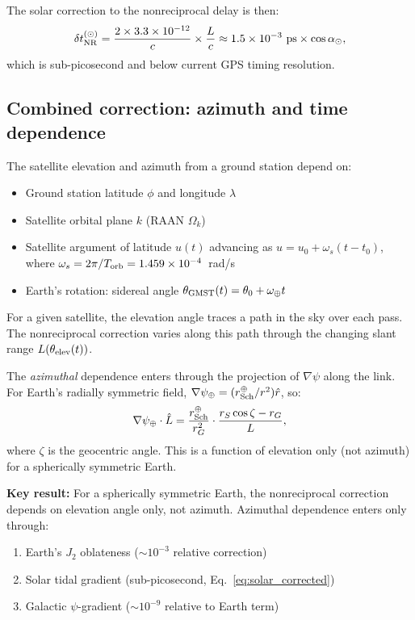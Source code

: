 \documentclass[aps,prl,twocolumn,superscriptaddress,showpacs]{revtex4-2}
\newcommand{\rSch}{r_{\rm Sch}}
\begin{document}
The solar correction to the nonreciprocal delay is then:
\begin{equation}
\delta t_{\rm NR}^{(\odot)} = \frac{2\times 3.3\times 10^{-12}}{c}
\times\frac{L}{c} \approx 1.5\times 10^{-3}~\text{ps}\times\cos\alpha_\odot,
\label{eq:solar_corrected}
\end{equation}
which is sub-picosecond and below current GPS timing resolution.

\subsection{Combined correction: azimuth and time dependence}

The satellite elevation and azimuth from a ground station depend on:
\begin{itemize}
\item Ground station latitude $\phi$ and longitude $\lambda$
\item Satellite orbital plane $k$ (RAAN $\Omega_k$)
\item Satellite argument of latitude $u(t)$ advancing as
      $u = u_0 + \omega_s(t - t_0)$, where
      $\omega_s = 2\pi/T_{\rm orb} = 1.459\times 10^{-4}$~rad/s
\item Earth's rotation: sidereal angle
      $\theta_{\rm GMST}(t) = \theta_0 + \omega_\oplus t$
\end{itemize}

For a given satellite, the elevation angle traces a path in the
sky over each pass.  The nonreciprocal correction varies along
this path through the changing slant range $L(\theta_{\rm elev}(t))$.

The \emph{azimuthal} dependence enters through the projection
of $\nabla\psi$ along the link.  For Earth's radially symmetric
field, $\nabla\psi_\oplus = (\rSch^\oplus/r^2)\hat{r}$, so:
\begin{equation}
\nabla\psi_\oplus\cdot\hat{L} = \frac{\rSch^\oplus}{r_G^2}
\cdot\frac{r_S\cos\zeta - r_G}{L},
\end{equation}
where $\zeta$ is the geocentric angle.  This is a function of
elevation only (not azimuth) for a spherically symmetric Earth.

\textbf{Key result:} For a spherically symmetric Earth, the
nonreciprocal correction depends on elevation angle only, not
azimuth.  Azimuthal dependence enters only through:
\begin{enumerate}
\item Earth's $J_2$ oblateness ($\sim 10^{-3}$ relative correction)
\item Solar tidal gradient (sub-picosecond, Eq.~\ref{eq:solar_corrected})
\item Galactic $\psi$-gradient ($\sim 10^{-9}$ relative to Earth term)
\end{enumerate}
\end{document}

